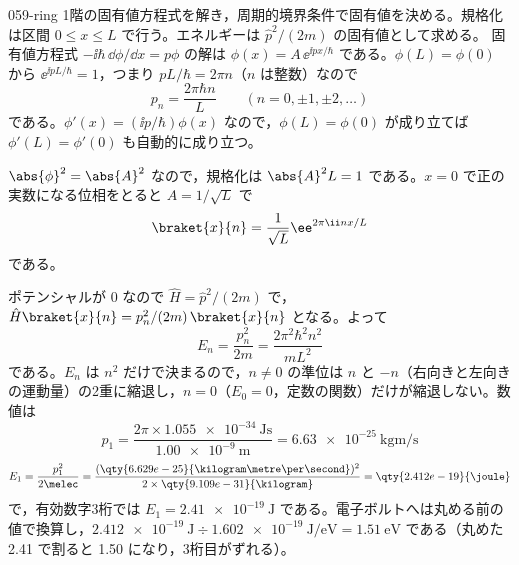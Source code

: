 \documentclass[uplatex,dvipdfmx,a4paper,11pt]{jsarticle}
\begin{document}
\begin{kaisetsu}{059-ring}
\houshin 1階の固有値方程式を解き，周期的境界条件で固有値を決める。規格化は区間 $0\le x\le L$ で行う。エネルギーは $\hat{p}^{2}/(2m)$ の固有値として求める。
\keisan {} 固有値方程式 $-\ii\hbar\,\dd\phi/\dd x=p\phi$ の解は $\phi(x)=A\,\ee^{\ii px/\hbar}$ である。$\phi(L)=\phi(0)$ から $\ee^{\ii pL/\hbar}=1$，つまり $pL/\hbar=2\pi n$（$n$ は整数）なので
\[ p_{n}=\frac{2\pi\hbar n}{L}\qquad(n=0,\pm1,\pm2,\ldots) \]
である。$\phi'(x)=(\ii p/\hbar)\phi(x)$ なので，$\phi(L)=\phi(0)$ が成り立てば $\phi'(L)=\phi'(0)$ も自動的に成り立つ。

 $\abs{\phi}^{2}=\abs{A}^{2}$ なので，規格化は $\abs{A}^{2}L=1$ である。$x=0$ で正の実数になる位相をとると $A=1/\sqrt{L}$ で
\[ \braket{x}{n}=\frac{1}{\sqrt{L}}\ee^{2\pi\ii nx/L} \]
である。

 ポテンシャルが $0$ なので $\hat{H}=\hat{p}^{2}/(2m)$ で，$\hat{H}\braket{x}{n}=p_{n}^{2}/(2m)\,\braket{x}{n}$ となる。よって
\[ E_{n}=\frac{p_{n}^{2}}{2m}=\frac{2\pi^{2}\hbar^{2}n^{2}}{mL^{2}} \]
である。$E_{n}$ は $n^{2}$ だけで決まるので，$n\neq0$ の準位は $n$ と $-n$（右向きと左向きの運動量）の2重に縮退し，$n=0$（$E_{0}=0$，定数の関数）だけが縮退しない。数値は
\[ p_{1}=\frac{2\pi\times\qty{1.055e-34}{\joule\second}}{\qty{1.00e-9}{\metre}}=\qty{6.63e-25}{\kilogram\metre\per\second} \]
\[ E_{1}=\frac{p_{1}^{2}}{2\melec}=\frac{(\qty{6.629e-25}{\kilogram\metre\per\second})^{2}}{2\times\qty{9.109e-31}{\kilogram}}=\qty{2.412e-19}{\joule} \]
で，有効数字3桁では $E_{1}=\qty{2.41e-19}{\joule}$ である。電子ボルトへは丸める前の値で換算し，$\qty{2.412e-19}{\joule}\div\qty{1.602e-19}{\joule\per\electronvolt}=\qty{1.51}{\electronvolt}$ である（丸めた \num{2.41} で割ると \num{1.50} になり，3桁目がずれる）。


\end{kaisetsu}
\end{document}
